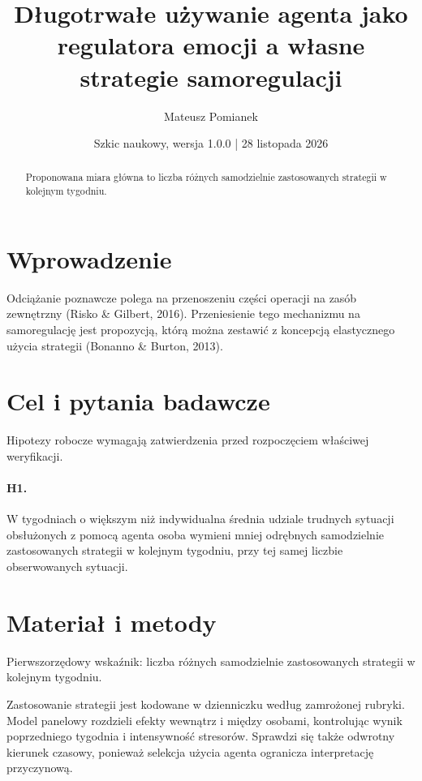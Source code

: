 \documentclass[11pt,a4paper]{article}
\title{Długotrwałe używanie agenta jako regulatora emocji a własne strategie samoregulacji}
\author{Mateusz Pomianek}
\date{Szkic naukowy, wersja 1.0.0 | 28 listopada 2026}
\begin{document}
\maketitle

\begin{abstract}

Proponowana miara główna to liczba różnych samodzielnie zastosowanych strategii w kolejnym tygodniu.

\end{abstract}

\section{Wprowadzenie}

Odciążanie poznawcze polega na przenoszeniu części operacji na zasób zewnętrzny (Risko \& Gilbert, 2016). Przeniesienie tego mechanizmu na samoregulację jest propozycją, którą można zestawić z koncepcją elastycznego użycia strategii (Bonanno \& Burton, 2013).

\section{Cel i pytania badawcze}

Hipotezy robocze wymagają zatwierdzenia przed rozpoczęciem właściwej weryfikacji.

\paragraph{H1.} W tygodniach o większym niż indywidualna średnia udziale trudnych sytuacji obsłużonych z pomocą agenta osoba wymieni mniej odrębnych samodzielnie zastosowanych strategii w kolejnym tygodniu, przy tej samej liczbie obserwowanych sytuacji.

\section{Materiał i metody}

Pierwszorzędowy wskaźnik: liczba różnych samodzielnie zastosowanych strategii w kolejnym tygodniu.

Zastosowanie strategii jest kodowane w dzienniczku według zamrożonej rubryki. Model panelowy rozdzieli efekty wewnątrz i między osobami, kontrolując wynik poprzedniego tygodnia i intensywność stresorów. Sprawdzi się także odwrotny kierunek czasowy, ponieważ selekcja użycia agenta ogranicza interpretację przyczynową.
\end{document}
